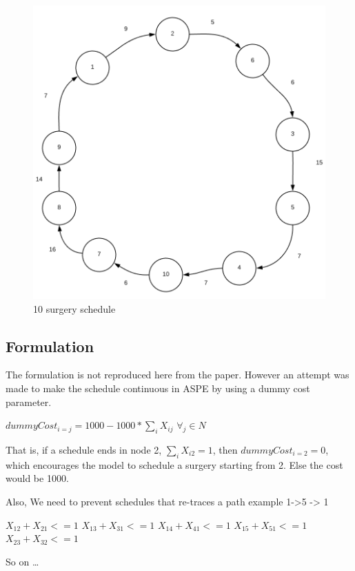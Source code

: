 \documentclass[]{article}
\begin{document}
\begin{figure}[h]

{\centering \includegraphics{Figures/Homework3/p3bS} 

}

\caption{10 surgery schedule}\label{fig:unnamed-chunk-7}
\end{figure}

\subsection{Formulation}\label{formulation-2}

The formulation is not reproduced here from the paper. However an
attempt was made to make the schedule continuous in ASPE by using a
dummy cost parameter.

\(dummyCost_{i=j} = 1000 - 1000* \sum_{i}X_{ij}\) \(\forall_{j} \in N\)

That is, if a schedule ends in node 2, \(\sum_{i}X_{i2} = 1\), then
\(dummyCost_{i=2} = 0\), which encourages the model to schedule a
surgery starting from 2. Else the cost would be 1000.

Also, We need to prevent schedules that re-traces a path example
1-\textgreater{}5 -\textgreater{} 1

\(X_{12} + X_{21} <= 1\) \(X_{13} + X_{31} <= 1\)
\(X_{14} + X_{41} <= 1\) \(X_{15} + X_{51} <= 1\)
\(X_{23} + X_{32} <= 1\)

So on \ldots{}
\end{document}
